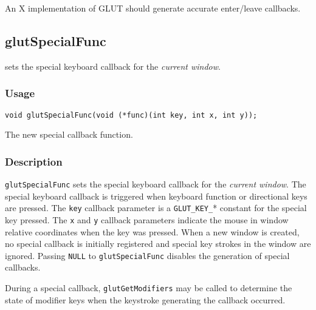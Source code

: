An X implementation of GLUT should generate accurate enter/leave callbacks.

\subsection{glutSpecialFunc}

 sets the special keyboard callback for the {\em current window}.

\subsubsection*{Usage}
\begin{verbatim}
void glutSpecialFunc(void (*func)(int key, int x, int y));
\end{verbatim}
\begin{description}
\itemsep 0in
\item[{\tt func}]
The new special callback function.
\end{description}

\subsubsection*{Description}

{\tt glutSpecialFunc} sets the special keyboard callback for the {\em current
window}.  The special keyboard callback is triggered when keyboard
function or directional keys are pressed.  The {\tt key} callback parameter
is a {\tt GLUT\_KEY\_}* constant for the special key pressed. 
The {\tt x} and {\tt y} callback parameters indicate the mouse in window
relative coordinates when the key was pressed.  When a new window is created, no
special callback is initially registered and special key strokes in the
window are ignored.  Passing {\tt NULL} to {\tt glutSpecialFunc}
disables the generation of special callbacks.

During a special callback, {\tt glutGetModifiers} may be called to determine
the state of modifier keys when the keystroke generating the callback occurred.

